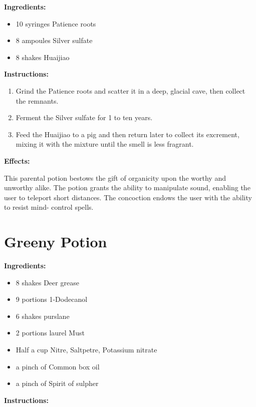 \documentclass{article}
\begin{document}
\textbf{Ingredients:}

\begin{itemize}
  \item 10 syringes Patience roots
  \item 8 ampoules Silver sulfate
  \item 8 shakes Huaijiao
\end{itemize}

\textbf{Instructions:}

\begin{enumerate}
  \item Grind the Patience roots and scatter it in a deep, glacial cave, then collect the remnants.
  \item Ferment the Silver sulfate for 1 to ten years.
  \item Feed the Huaijiao to a pig and then return later to collect its excrement, mixing it with the mixture until the smell is less fragrant.
\end{enumerate}

\textbf{Effects:}

This parental potion bestows the gift of organicity upon the worthy and unworthy alike. The potion grants the ability to manipulate sound, enabling the user to teleport short distances. The concoction endows the user with the ability to resist mind- control spells.

\newpage
\section*{Greeny Potion}

\textbf{Ingredients:}

\begin{itemize}
  \item 8 shakes Deer grease
  \item 9 portions 1-Dodecanol
  \item 6 shakes purslane
  \item 2 portions laurel Must
  \item Half a cup Nitre, Saltpetre, Potassium nitrate
  \item a pinch of Common box oil
  \item a pinch of Spirit of sulpher
\end{itemize}

\textbf{Instructions:}
\end{document}
